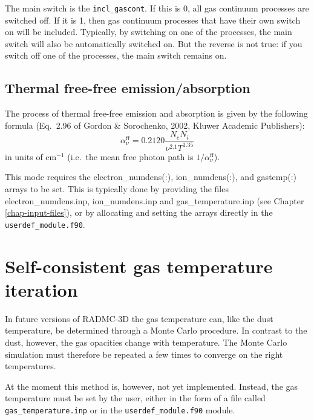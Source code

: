\documentclass{report}
\begin{document}
The main switch is the {\small\tt incl\_gascont}. If this is 0, all gas
continuum processes are switched off. If it is 1, then gas continuum
processes that have their own switch on will be included. Typically, by
switching on one of the processes, the main switch will also be automatically
switched on. But the reverse is not true: if you switch off one of the
processes, the main switch remains on. 


\subsection{Thermal free-free emission/absorption}
The process of thermal free-free emission and absorption is given by the
following formula (Eq.\ 2.96 of Gordon \& Sorochenko, 2002, Kluwer Academic
Publishers):
\begin{equation}
\alpha_\nu^{\mathrm{ff}} = 0.2120 \frac{N_e N_i}{\nu^{2.1} T^{1.35}}
\end{equation}
in units of cm$^{-1}$ (i.e.\ the mean free photon path is
$1/\alpha_\nu^{\mathrm{ff}}$).

This mode requires the {\small electron\_numdens(:)}, {\small
  ion\_numdens(:)}, and {\small gastemp(:)} arrays to be set. This is
typically done by providing the files {\small electron\_numdens.inp},
{\small ion\_numdens.inp} and {\small gas\_temperature.inp} (see Chapter
\ref{chap-input-files}), or by allocating and setting the arrays directly in
the {\small\tt userdef\_module.f90}.






\section{Self-consistent gas temperature iteration}
In future versions of RADMC-3D the gas temperature can, like the dust
temperature, be determined through a Monte Carlo procedure. In contrast
to the dust, however, the gas opacities change with temperature. The
Monte Carlo simulation must therefore be repeated a few times to converge
on the right temperatures. 

At the moment this method is, however, not yet implemented. Instead, the gas
temperature must be set by the user, either in the form of a file called
{\small\tt gas\_temperature.inp} or in the {\small\tt userdef\_module.f90}
module.






\end{document}
